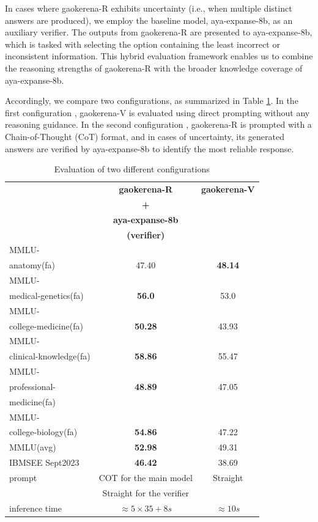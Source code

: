 \documentclass[conference]{IEEEtran}
\begin{document}
In cases where gaokerena-R exhibits uncertainty (i.e., when multiple distinct answers are produced), we employ the baseline model, aya-expanse-8b, as an auxiliary verifier. The outputs from gaokerena-R are presented to aya-expanse-8b, which is tasked with selecting the option containing the least incorrect or inconsistent information. This hybrid evaluation framework enables us to combine the reasoning strengths of gaokerena-R with the broader knowledge coverage of aya-expanse-8b. 

Accordingly, we compare two configurations, as summarized in Table
\ref{tab:med_opns_comparison}.
 In the first configuration , gaokerena-V is evaluated using direct prompting without any reasoning guidance. In the second configuration , gaokerena-R is prompted with a Chain-of-Thought (CoT) format, and in cases of uncertainty, its generated answers are verified by aya-expanse-8b to identify the most reliable response.

	\begin{table}[ht]
		\centering
		\caption{Evaluation of two different configurations}
		\begin{tabular}{|l|c|c|}  
			\hline
			\textbf{} & \textbf{gaokerena-R} & \textbf{gaokerena-V}  \\ 
			& \textbf{+} &   \\
			& \textbf{ aya-expanse-8b}  &     \\ 
                        & \textbf{(verifier)}  &     \\ \hline
			MMLU- &  &    \\ 
			anatomy(fa)  & 47.40  & \textbf{48.14}   \\ \hline
			MMLU- &   &      \\
			medical-genetics(fa) & \textbf{56.0}  & 53.0   \\ \hline
			MMLU- &  &      \\
			college-medicine(fa) & \textbf{50.28} & 43.93    \\ \hline
			MMLU- &    &    \\
			clinical-knowledge(fa) & \textbf{58.86}  & 55.47  \\ \hline
			MMLU- &  &    \\
			professional-& \textbf{48.89} & 47.05  \\
                        medicine(fa)& &      \\ \hline
			MMLU- &  &   \\
			college-biology(fa)& \textbf{54.86} & 47.22   \\ \hline
			MMLU(avg) & \textbf{52.98}  & 49.31   \\ \hline
			IBMSEE Sept2023 & \textbf{46.42}  &38.69   \\ \hline
                        prompt & COT for the main model & Straight   \\ 
                        &            Straight for the verifier   &   \\ \hline
			inference time & $\approx 5 \times 35 + 8 s$ & $\approx 10s$  \\  \hline
		\end{tabular}
		\label{tab:med_opns_comparison}
	\end{table}
        
\end{document}
